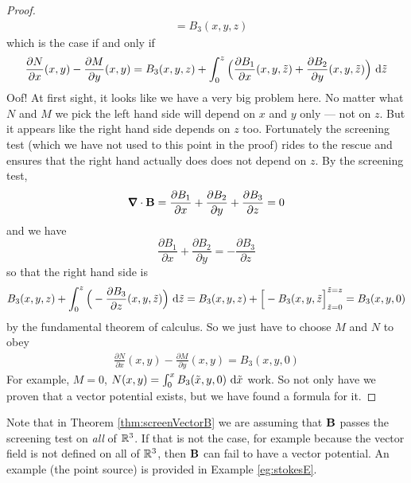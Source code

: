 \begin{proof}
\begin{align*}
&=B_3(x,y,z)
\end{align*}
which is the case if and only if
\begin{align*}
\frac{\partial N}{\partial x}(x,y) -\frac{\partial M}{\partial y}(x,y) =
         B_3(x,y,z) 
         + \int_0^z\Big(\frac{\partial B_1}{\partial x}(x,y,\tilde z) 
         + \frac{\partial B_2}{\partial y}(x,y,\tilde z)\Big)
                            \ \mathrm{d}\tilde z
\end{align*}
Oof! At first sight, it looks like we have a very big problem here.
No matter what $N$ and $M$ we pick the left hand side will depend on $x$ 
and $y$ only --- not on $z$. But it appears like the right hand side
depends on $z$ too. Fortunately the screening test (which we have not used
to this point in the proof) rides to the rescue
and ensures that the right hand actually does does not depend on $z$.
By the screening test,
\begin{equation*}
\vnabla\cdot\vB
=\frac{\partial B_1}{\partial x}
+\frac{\partial B_2}{\partial y}
+\frac{\partial B_3}{\partial z}=0
\end{equation*}
and we have
\begin{equation*}
\frac{\partial B_1}{\partial x}
+\frac{\partial B_2}{\partial y}
=-\frac{\partial B_3}{\partial z}
\end{equation*}
so that the right hand side is
\begin{align*}
         B_3(x,y,z) 
        + \int_0^z\Big(-\frac{\partial B_3}{\partial z}(x,y,\tilde z) \Big)
                                        \ \mathrm{d}\tilde z
       = B_3(x,y,z) +\Big[-B_3(x,y,\tilde z\Big]^{\tilde z=z}_{\tilde z=0}
       =B_3(x,y,0)
\end{align*}
by the fundamental theorem of calculus. So we just have to choose $M$ and $N$ to
obey
\begin{align*}
\frac{\partial N}{\partial x}(x,y) -\frac{\partial M}{\partial y}(x,y) =
         B_3(x,y,0) 
\end{align*}
For example, $M=0$, $N(x,y) = \int _0^x B_3(\tilde x,y,0)\ \dee{\tilde x}$
work. So not only have we proven that a vector potential exists, but we have found a formula for it. 
\end{proof}

\begin{warning}\label{warn:screeningC}
Note that in Theorem \ref{thm:screenVectorB} we are assuming that
$\mathbf{B}$ passes the screening test on \emph{all} of $\mathbb{R}^3$.
If that is not the case, for example
because the vector field is not defined on all of $\mathbb{R}^3$, then 
$\mathbf{B}$ can fail to have a vector potential. An example (the point source)
is provided in Example \ref{eg:stokesE}.
\end{warning}



